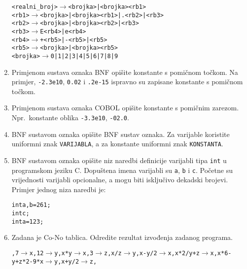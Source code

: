 \documentclass[times, 12pt, utf8]{book}
\begin{document}
\begin{enumerate}[resume]
\begin{alltt}
<realni_broj> \(\to\) <brojka> | <brojka> <rb1> 
<rb1> \(\to\) <brojka> | <brojka> <rb1> | . <rb2> | <rb3> 
<rb2> \(\to\) <brojka> | <brojka> <rb2> | <rb3> 
<rb3> \(\to\) E <rb4> | e <rb4> 
<rb4> \(\to\) + <rb5> | - <rb5> | <rb5> 
<rb5> \(\to\) <brojka> | <brojka> <rb5> 
<brojka> \(\to\) 0 | 1 | 2 | 3 | 4 | 5 | 6 | 7 | 8 | 9 
\end{alltt} 

\item
Primjenom sustava oznaka BNF opišite konstante s pomičnom točkom.
Na primjer, \texttt{-2.3e10}, \texttt{0.02} i \texttt{.2e-15} ispravno su zapisane konstante s pomičnom točkom. \cite[str.~81]{udzbenik}

\item
Primjenom sustava oznaka COBOL opišite konstante s pomičnim zarezom.
Npr.~konstante oblika \texttt{-3.3e10}, \texttt{-02.0}. \cite[str.~82]{udzbenik}

\item
BNF sustavom oznaka opišite BNF sustav oznaka.
Za varijable koristite uniformni znak \texttt{VARIJABLA}, a za konstante uniformni znak \texttt{KONSTANTA}. \cite[str.~81]{udzbenik}

\item
BNF sustavom oznaka opišite niz naredbi definicije varijabli tipa \texttt{int} u programskom jeziku C.
Dopuštena imena varijabli su \texttt{a}, \texttt{b} i \texttt{c}.
Početne su vrijednosti varijabli opcionalne, a mogu biti isključivo dekadski brojevi.
Primjer jednog niza naredbi je: \cite[str.~81]{udzbenik}

\begin{alltt}
int a, b=261;
int c;
int a=123;
\end{alltt}

\item
Zadana je Co-No tablica.
Odredite rezultat izvođenja zadanog programa. \cite[str.~83-84]{udzbenik} \cite{auditorne}

\texttt{,7\(\to\)x,12\(\to\)y,x*y\(\to\)x,3\(\to\)z,x/z\(\to\)y,x-y/2\(\to\)x,x*2/y+z\(\to\)x,x*6-y+z*2-9*x\(\to\)y,x+y/2\(\to\)z,}


\end{enumerate}
\end{document}
